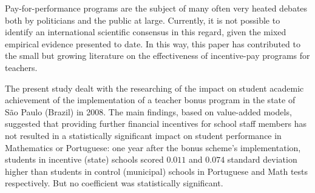 \documentclass[a4paper, 12pt]{article}
\begin{document}

Pay-for-performance programs are the subject of many often very heated debates \textemdash both by politicians and the public at large. Currently, it is not possible to identify an international scientific consensus in this regard, given the mixed empirical evidence presented to date. In this way, this paper has contributed to the small but growing literature on the effectiveness of incentive-pay programs for teachers.


The present study dealt with the researching of the impact on student academic achievement of the implementation of a teacher bonus program in the state of São Paulo (Brazil) in 2008. The main findings, based on value-added models, suggested that providing further financial incentives for school staff members has not resulted in a statistically significant impact on student performance in Mathematics or Portuguese: one year after the bonus scheme’s implementation, students in incentive (state) schools scored $0.011$ and $0.074$ standard deviation higher than students in control (municipal) schools in Portuguese and Math tests respectively. But no coefficient was statistically significant. %




\end{document}
